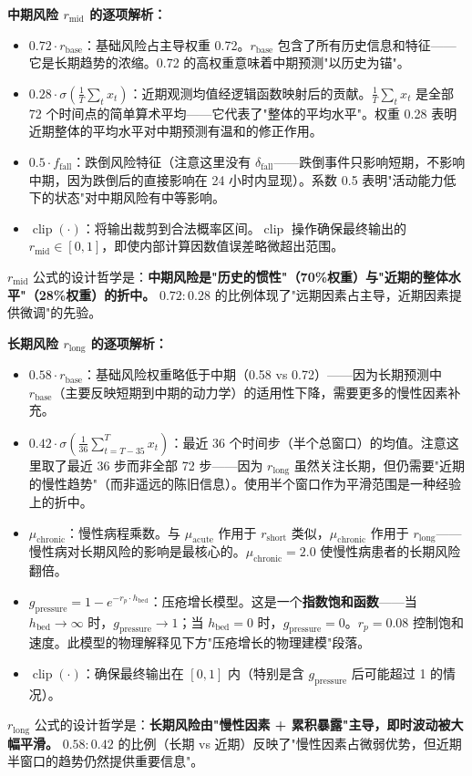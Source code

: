 \documentclass[11pt,a4paper]{ctexart}
\theoremstyle{remark}
\DeclareMathOperator{\clip}{clip}
\begin{document}
\textbf{中期风险 $r_{\text{mid}}$ 的逐项解析：}
\begin{itemize}[nosep]
\item $0.72 \cdot r_{\text{base}}$：基础风险占主导权重 0.72。$r_{\text{base}}$ 包含了所有历史信息和特征——它是长期趋势的浓缩。0.72 的高权重意味着中期预测"以历史为锚"。
\item $0.28 \cdot \sigma(\frac{1}{T}\sum_t x_t)$：近期观测均值经逻辑函数映射后的贡献。$\frac{1}{T}\sum_t x_t$ 是全部 72 个时间点的简单算术平均——它代表了"整体的平均水平"。权重 0.28 表明近期整体的平均水平对中期预测有温和的修正作用。
\item $0.5 \cdot f_{\text{fall}}$：跌倒风险特征（注意这里没有 $\delta_{\text{fall}}$——跌倒事件只影响短期，不影响中期，因为跌倒后的直接影响在 24 小时内显现）。系数 0.5 表明"活动能力低下的状态"对中期风险有中等影响。
\item $\clip(\cdot)$：将输出裁剪到合法概率区间。$\clip$ 操作确保最终输出的 $r_{\text{mid}} \in [0,1]$，即使内部计算因数值误差略微超出范围。
\end{itemize}
$r_{\text{mid}}$ 公式的设计哲学是：\textbf{中期风险是"历史的惯性"（70\%权重）与"近期的整体水平"（28\%权重）的折中。} $0.72:0.28$ 的比例体现了"远期因素占主导，近期因素提供微调"的先验。

\textbf{长期风险 $r_{\text{long}}$ 的逐项解析：}
\begin{itemize}[nosep]
\item $0.58 \cdot r_{\text{base}}$：基础风险权重略低于中期（0.58 vs 0.72）——因为长期预测中 $r_{\text{base}}$（主要反映短期到中期的动力学）的适用性下降，需要更多的慢性因素补充。
\item $0.42 \cdot \sigma(\frac{1}{36}\sum_{t=T-35}^{T} x_t)$：最近 36 个时间步（半个总窗口）的均值。注意这里取了最近 36 步而非全部 72 步——因为 $r_{\text{long}}$ 虽然关注长期，但仍需要"近期的慢性趋势"（而非遥远的陈旧信息）。使用半个窗口作为平滑范围是一种经验上的折中。
\item $\mu_{\text{chronic}}$：慢性病程乘数。与 $\mu_{\text{acute}}$ 作用于 $r_{\text{short}}$ 类似，$\mu_{\text{chronic}}$ 作用于 $r_{\text{long}}$——慢性病对长期风险的影响是最核心的。$\mu_{\text{chronic}} = 2.0$ 使慢性病患者的长期风险翻倍。
\item $g_{\text{pressure}} = 1 - e^{-r_p \cdot h_{\text{bed}}}$：压疮增长模型。这是一个\textbf{指数饱和函数}——当 $h_{\text{bed}} \to \infty$ 时，$g_{\text{pressure}} \to 1$；当 $h_{\text{bed}} = 0$ 时，$g_{\text{pressure}} = 0$。$r_p = 0.08$ 控制饱和速度。此模型的物理解释见下方"压疮增长的物理建模"段落。
\item $\clip(\cdot)$：确保最终输出在 $[0,1]$ 内（特别是含 $g_{\text{pressure}}$ 后可能超过 1 的情况）。
\end{itemize}
$r_{\text{long}}$ 公式的设计哲学是：\textbf{长期风险由"慢性因素 + 累积暴露"主导，即时波动被大幅平滑。} $0.58:0.42$ 的比例（长期 vs 近期）反映了"慢性因素占微弱优势，但近期半窗口的趋势仍然提供重要信息"。
\end{document}
